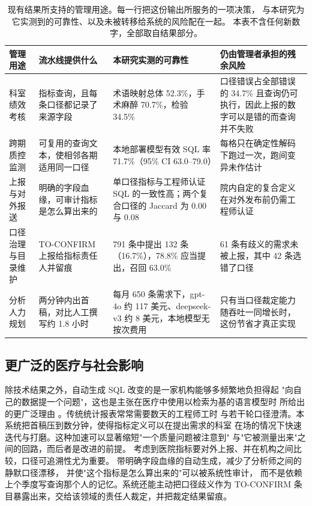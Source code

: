 \documentclass[11pt,a4paper]{article}
\begin{document}
\begin{table}[H]
\caption{现有结果所支持的管理用途。每一行把这份输出所服务的一项决策，
与本研究为它实测到的可靠性、以及未被转移给系统的风险配在一起。
本表不含任何新数字，全部取自结果部分。}
\label{tab:cn-mgmt}
\centering
\footnotesize
\setlength{\tabcolsep}{4pt}
\begin{tabular}{L{2.2cm}L{3.2cm}L{3.2cm}L{3.4cm}}
\toprule
管理用途 & 流水线提供什么 & 本研究实测的可靠性 & 仍由管理者承担的残余风险\\
\midrule
科室绩效考核 &
指标查询，且每条口径都记录了来源字段 &
术语映射总体 52.3\%，手术麻醉 70.7\%，检验 34.5\% &
口径错误占全部错误的 34.7\% 且查询仍可执行，因此上报的数字可以是错的而查询并不失败\\
\addlinespace
跨期质控监测 &
可复用的查询文本，使相邻各期适用同一口径 &
本地部署模型有效 SQL 率 71.7\%（95\% CI 63.0--79.0） &
每格只在确定性解码下跑过一次，跑间变异未作估计\\
\addlinespace
上报与对外报送 &
明确的字段血缘，可审计指标是怎么算出来的 &
单口径指标与工程师认证 SQL 的一致性高；两个复合口径的 Jaccard 为 0.00 与 0.08 &
院内自定的复合定义在对外发布前仍需工程师认证\\
\addlinespace
口径治理与目录维护 &
TO-CONFIRM 上报给指标责任人并留痕 &
791 条中提出 132 条（16.7\%），78.8\% 应当提出，召回 63.0\% &
61 条有歧义的需求未被上报，其中 42 条选错了口径\\
\addlinespace
分析人力规划 &
两分钟内出首稿，对比人工撰写约 1.8 小时 &
每月 650 条需求下，gpt-4o 约 117 美元、deepseek-v3 约 8 美元，本地模型无按次费用 &
只有当口径裁定能力随吞吐一同增长时，这份节省才真正实现\\
\bottomrule
\end{tabular}
\end{table}

\subsection{更广泛的医疗与社会影响}
除技术结果之外，自动生成 SQL 改变的是一家机构能够多频繁地负担得起
"向自己的数据提一个问题"，这也是主张在医疗中使用以检索为基的语言模型时
所给出的更广泛理由 \cite{ng2025}。传统统计报表常常需要数天的工程师工时
与若干轮口径澄清。本系统把首稿压到数分钟，使得指标定义可以在提出需求的科室
在场的情况下快速迭代与打磨。这种加速可以显著缩短"一个质量问题被注意到"
与"它被测量出来"之间的回路，而后者是改进的前提。
考虑到医院指标要对外上报、并在机构之间比较，口径可追溯性尤为重要。
带明确字段血缘的自动生成，减少了分析师之间的静默口径漂移，
并使"这个指标是怎么算出来的"可以被系统性审计，
而不是依赖上个季度写查询那个人的记忆。系统还能主动把口径歧义作为
TO-CONFIRM 条目暴露出来，交给该领域的责任人裁定，并把裁定结果留痕。
\end{document}

